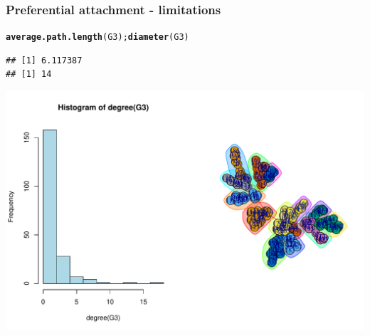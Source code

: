 \documentclass{beamer}\usepackage[]{graphicx}\usepackage[]{color}
\makeatletter
\newcommand{\hlstd}[1]{\textcolor[rgb]{0.345,0.345,0.345}{#1}}%
\newcommand{\hlkwd}[1]{\textcolor[rgb]{0.737,0.353,0.396}{\textbf{#1}}}%
\newenvironment{kframe}{%
 \def\at@end@of@kframe{}%
 \ifinner\ifhmode%
  \def\at@end@of@kframe{\end{minipage}}%
  \begin{minipage}{\columnwidth}%
 \fi\fi%
 \def\FrameCommand##1{\hskip\@totalleftmargin \hskip-\fboxsep
 \colorbox{shadecolor}{##1}\hskip-\fboxsep
     \hskip-\linewidth \hskip-\@totalleftmargin \hskip\columnwidth}%
 \MakeFramed {\advance\hsize-\width
   \@totalleftmargin\z@ \linewidth\hsize
   \@setminipage}}%
 {\par\unskip\endMakeFramed%
 \at@end@of@kframe}
\newenvironment{knitrout}{}{} %
\makeatother
\begin{document}
\begin{frame}[fragile]
  \frametitle{Preferential attachment - limitations}

\begin{knitrout}\scriptsize
{}\color{fgcolor}\begin{kframe}
\begin{alltt}
\hlkwd{average.path.length}\hlstd{(G3);} \hlkwd{diameter}\hlstd{(G3)}
\end{alltt}
\begin{verbatim}
## [1] 6.117387
## [1] 14
\end{verbatim}
\end{kframe}
\end{knitrout}

\begin{knitrout}\scriptsize
{}\color{fgcolor}
\includegraphics[width=.8\textwidth]{figures/PA_limitation2-1} 
\end{knitrout}
\end{frame}
\end{document}
